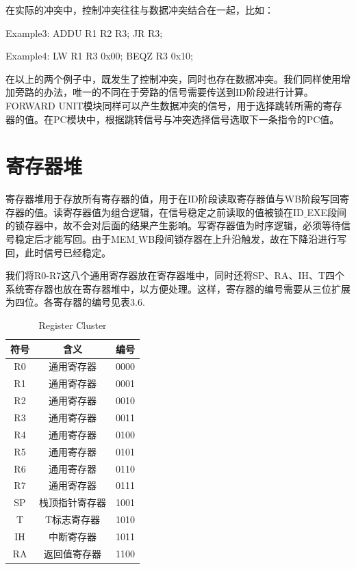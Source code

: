 在实际的冲突中，控制冲突往往与数据冲突结合在一起，比如：

Example3: ADDU R1 R2 R3; JR R3;

Example4: LW R1 R3 0x00; BEQZ R3 0x10;

在以上的两个例子中，既发生了控制冲突，同时也存在数据冲突。我们同样使用增加旁路的办法，唯一的不同在于旁路的信号需要传送到ID阶段进行计算。FORWARD UNIT模块同样可以产生数据冲突的信号，用于选择跳转所需的寄存器的值。在PC模块中，根据跳转信号与冲突选择信号选取下一条指令的PC值。


\section{寄存器堆}

寄存器堆用于存放所有寄存器的值，用于在ID阶段读取寄存器值与WB阶段写回寄存器的值。读寄存器值为组合逻辑，在信号稳定之前读取的值被锁在ID$\_$EXE段间的锁存器中，故不会对后面的结果产生影响。写寄存器值为时序逻辑，必须等待信号稳定后才能写回。由于MEM$\_$WB段间锁存器在上升沿触发，故在下降沿进行写回，此时信号已经稳定。

我们将R0-R7这八个通用寄存器放在寄存器堆中，同时还将SP、RA、IH、T四个系统寄存器也放在寄存器堆中，以方便处理。这样，寄存器的编号需要从三位扩展为四位。各寄存器的编号见表3.6.

\begin{table}[H]
\begin{center}
\caption{Register Cluster}
\label{tab:treatments}
\begin{tabular}{|c|cc|}
\hline
符号 & 含义 & 编号 \\
\hline
R0 & 通用寄存器 & 0000 \\
\hline
R1 & 通用寄存器 & 0001 \\
\hline
R2 & 通用寄存器 & 0010 \\
\hline
R3 & 通用寄存器 & 0011 \\
\hline
R4 & 通用寄存器 & 0100 \\
\hline
R5 & 通用寄存器 & 0101 \\
\hline
R6 & 通用寄存器 & 0110 \\
\hline
R7 & 通用寄存器 & 0111 \\
\hline
SP & 栈顶指针寄存器 & 1001 \\
\hline
T & T标志寄存器 & 1010 \\
\hline
IH & 中断寄存器 & 1011 \\
\hline 
RA & 返回值寄存器 & 1100 \\
\hline
\end{tabular}
\end{center}
\end{table}



